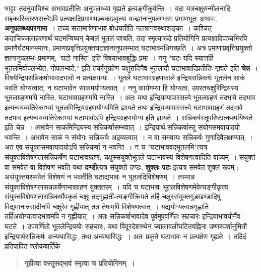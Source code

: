 {भाट्टाः तदनुयायिश्च अभावप्रतीतिः अनुपलब्ध्या गृह्यते इत्यङ्गीकुर्वन्ति~। यदा यत्र\break चक्षुरुन्मीलनादि सहकारिकारणसत्त्वेऽपि प्रत्यक्षादिप्रमाणपञ्चकाप्रवृत्या यज्ज्ञानानुपलम्भः\break सः प्रमाणभूतः अभावः, \textbf{अनुपलब्ध्यपरनामा}~। तच्च सत्तामात्रेणाभावं बोधयतीति न\break तत्रानवस्थाशङ्का~। कश्चित् कदाचिज्जलाहरणार्थं घटमन्विष्यन् केवलं भूतलं पश्यति, तदा स्मृत्या\-रूढे प्रतियोगिनि प्रत्यक्षादिपञ्चभिरपि प्रमाणैर्घटमलभमानः, प्रमाणाप्रवृत्तिप्रयुक्तघटज्ञानानुपलम्भात् घटाभावमधिगच्छति~। अत्र प्रमाणाप्रवृत्तिप्रयुक्तो ज्ञानानुपलम्भः प्रमाणम्, 'घटो नास्ति' इति विषयाभावबुद्धिः प्रमा~। ननु "घटः यदि स्यात्तर्हि भूतलमिवोपलभ्येत, नोपलभ्यते," इति तर्कानुग्रहेण चक्षुरादिनैव भूतलादौ घटाभावादिप्रतीतिः गृह्यते इति \textbf{चेन्न}~।\break विषयेन्द्रियसन्निकर्षाभावादभावो न प्रत्यक्षगम्यः~। भूतले घटाभावग्रहणकाले इन्द्रियसन्नि\-कर्षः भूतलेन साकं भवति योग्यत्वात्, न घटाभावेन साकमयोग्यत्वात्~। ननु कार्यगम्या हि योग्यता; उपरतचक्षुरिन्द्रियस्य भूतलग्रहणमपि नास्ति, घटाभावग्रहणमपि नास्ति~। अतः यथा इन्द्रियव्यापारसत्त्वे भूतलग्रहणं तदभावे तदभाव इत्यन्वयव्यतिरेकाभ्यां भूतलमिन्द्रियग्रहणयोग्यमिति ज्ञायते तथा इन्द्रियव्यापारसत्त्वे घटाभावग्रहणं तदभावे तदभाव इत्यन्वयव्यतिरेकाभ्यां घटाभावोऽपि इन्द्रियग्रहणयोग्य इति ज्ञायते~। सन्निकर्षस्तूपरिष्टात्कल्पयिष्यते इति चेन्न~। अभावेन साकमिन्द्रियस्य सन्निकर्षासम्भवात्~। इन्द्रियार्थ-सन्निकर्षास्तु संयोगसमवायादयो भवन्ति~। अभावेन साकं न संयोगः सन्निकर्षः अद्रव्यत्वात्~। न वा समवायः सन्निकर्षः गुणादिवैलक्षण्यात्~। अत एव संयुक्तसमवायादयोऽपि सन्निकर्षा न भवन्ति~। न च "घटाभाववद्भूतलमि"त्यत्र संयुक्तविशेषणतासन्निकर्षेण घटाभावग्रहणं; चक्षुस्संयुक्ते\break भूतले घटाभावस्य विशेषणत्वादिति वाच्यम्~। संयुक्तं वा समवेतं वा विशेषणं भवति यथा \textbf{दण्डी}त्यत्र संयुक्तो दण्डः, \textbf{शुक्लः पटः} इत्यत्र समवेतं शुक्लं रूपम् ; असंयुक्तमसमवेतं विशेषणं न भवतीति घटाद्यभावः न भूतलदिविशेषणम्~। तस्मान्न संयुक्तविशेषणतासन्नकर्षेणाभावग्रहणं युक्ततरम्~। यदि च घटाभावः भूतलविशेषणमेवेत्यङ्गीकृत्य संयुक्तविशेषणतासन्नि\-कर्षोपकृतं चक्षुः तद्गृह्णाती-त्यङ्गीक्रियते तर्हि चक्षुस्संयुक्तगुडखण्डादिषु विद्यमानान्\break रसादीनपि चक्षुरेव गृह्णीयात् तत्र तेषामपि विशेषणत्वात्~। यद्ययोग्यत्वान्नगृह्णाति तर्हि\break अयोग्यत्वादभावमपि न गृह्णीयात्~। अतः सन्निकर्षाभावादेव पूर्वमुपवर्णितः सहचारः इन्द्रियाभावयोर्नैव घटते~। उप\-वर्णितो भूतलेन्द्रिययोः सहचारः, यथा विदूरदेशस्थेन ज्वालावली\-घटितवह्निना उष्णस्पर्शानुमितौ इन्द्रियार्थसन्निकर्षः अन्यथासिद्धः, तथा अन्यथासिद्धः~। अतः प्रकृते घटाभावः न \-प्रत्यक्षेण गृह्यते~। तदिदं प्रतिपादितं श्लोकवार्तिके –
\begin{verse}
\textbf{गृहीत्वा वस्तुसद्भावं स्मृत्वा च प्रतियोगिनम्~। }\\

\end{verse}}
